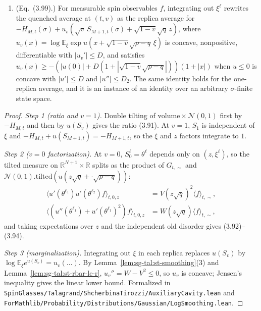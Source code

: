 \begin{lemma}[The auxiliary cavity path and its $v=0$ factorization]
\begin{enumerate}
state space.
\item (Eq.~(3.99).) For measurable spin observables $f$, integrating out $\xi^\ell$ rewrites the quenched
average at $(t,v)$ as the replica average for $-H_{M,t}(\sigma)+u_v(\sqrt v\,S_{M+1,t}(\sigma)+\sqrt{1-v}\sqrt q\,z)$,
where $u_v(x)=\log\mathbb E_\xi\exp u(x+\sqrt{1-v}\sqrt{\rho-q}\,\xi)$ is concave, nonpositive, differentiable
with $|u_v'|\le D$, and satisfies $u_v(x)\ge-(|u(0)|+D(1+|\sqrt{1-v}\sqrt{\rho-q}|))(1+|x|)$ when $u\le0$ is
concave with $|u'|\le D$ and $|u''|\le D_2$. The same identity holds for the one-replica average, and it is
an instance of an identity over an arbitrary $\sigma$-finite state space.
\end{enumerate}
\end{lemma}
\begin{proof}
  \leanok
\emph{Step 1 (ratio and $v=1$).} Double tilting of $\mathrm{volume}\times\mathcal N(0,1)$ first by $-H_{M,t}$
and then by $u(S_v)$ gives the ratio (3.91). At $v=1$, $S_1$ is independent of $\xi$ and
$-H_{M,t}+u(S_{M+1,t})=-H_{M+1,t}$, so the $\xi$ and $z$ factors integrate to $1$.

\emph{Step 2 ($v=0$ factorization).} At $v=0$, $S_0^\ell=\theta^\ell$ depends only on $(z,\xi^\ell)$, so the
tilted measure on $\mathbb R^{N+1}\times\mathbb R$ splits as the product of $G_{t,\sim}$ and
$\mathcal N(0,1).\mathrm{tilted}(u(z\sqrt q+\cdot\sqrt{\rho-q}))$:
\begin{align*}
\bigl\langle u'(\theta^{\ell_1})u'(\theta^{\ell_2})f\bigr\rangle_{t,0,z}
&=V(z\sqrt q)^2\langle f\rangle_{t,\sim},\\
\bigl\langle(u''(\theta^{\ell_1})+u'(\theta^{\ell_1})^2)f\bigr\rangle_{t,0,z}
&=W(z\sqrt q)\langle f\rangle_{t,\sim},
\end{align*}
and taking expectations over $z$ and the independent old disorder gives (3.92)--(3.94).

\emph{Step 3 (marginalization).} Integrating out $\xi$ in each replica replaces $u(S_v)$ by $\log\mathbb E_\xi e^{u(S_v)}=u_v(\dots)$.
By Lemma~\ref{lem:sg-tal:st-smoothing}(3) and Lemma~\ref{lem:sg-tal:st-rbar-le-r}, $u_v''=W-V^2\le0$, so $u_v$ is
concave; Jensen's inequality gives the linear lower bound.
Formalized in \texttt{SpinGlasses/Talagrand/ShcherbinaTirozzi/AuxiliaryCavity.lean} and
\texttt{ForMathlib/Probability/Distributions/Gaussian/LogSmoothing.lean}.
\end{proof}

